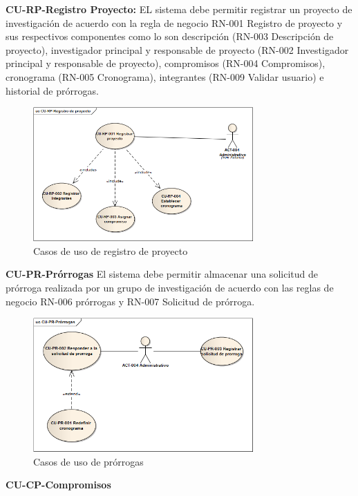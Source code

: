 \documentclass[12pt,oneside,letterpaper]{report}
\begin{document}
\textbf{CU-RP-Registro Proyecto:}
EL sistema debe permitir registrar un proyecto de investigación  de acuerdo con la regla de negocio RN-001 Registro de proyecto y sus respectivos componentes como lo son descripción (RN-003 Descripción de proyecto), investigador principal y responsable de proyecto  (RN-002 Investigador principal y responsable de proyecto), compromisos (RN-004 Compromisos), cronograma (RN-005 Cronograma), integrantes (RN-009 Validar usuario) e historial de prórrogas.

\begin{figure}[h!]
  \centering
    \includegraphics[width=0.75\textwidth]{./img/img4.png}
  \caption{Casos de uso de registro de proyecto}
\end{figure}

\textbf{CU-PR-Prórrogas}
El sistema debe permitir almacenar una solicitud de prórroga realizada por un grupo de investigación de acuerdo con las reglas de negocio  RN-006 prórrogas y RN-007 Solicitud de prórroga.

\begin{figure}[h!]
  \centering
    \includegraphics[width=0.75\textwidth]{./img/img5.png}
  \caption{Casos de uso de prórrogas}
\end{figure}

\textbf{CU-CP-Compromisos}
\end{document}
